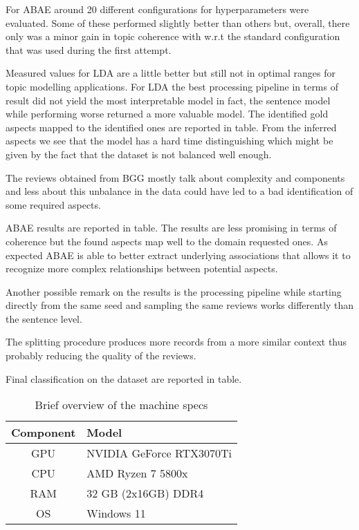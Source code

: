 For ABAE around 20 different configurations for hyperparameters were evaluated.
Some of these performed slightly better than others but, overall, there only was a minor gain in topic coherence with
w.r.t the standard configuration that was used during the first attempt.

Measured values for LDA are a little better but still not in optimal ranges for topic modelling applications.
For LDA the best processing pipeline in terms of result did not yield the most interpretable model in fact,
the sentence model while performing worse returned a more valuable model.
The identified gold aspects mapped to the identified ones are reported in table. %
From the inferred aspects we see that the model has a hard time distinguishing %
which might be given by the fact that the dataset is not balanced well enough.

The reviews obtained from BGG mostly talk about complexity and components and less about %
this unbalance in the data could have led to a bad identification of some required aspects.

ABAE results are reported in table.
The results are less promising in terms of coherence but the found aspects map well to the domain requested
ones.
As expected ABAE is able to better extract underlying associations that allows it to recognize more complex relationships
between potential aspects.

Another possible remark on the results is the processing pipeline while starting directly from the same
seed and sampling the same reviews works differently than the sentence level.

The splitting procedure produces more records from a more similar context thus probably reducing the
quality of the reviews.



Final classification on the dataset are reported in table.
\begin{center}
    \begin{table}
        \begin{tabular}{|c l|}
            \hline
            Component & Model \\ [0.5ex]
            \hline\hline
            GPU       & NVIDIA GeForce RTX3070Ti \\
            \hline
            CPU       & AMD Ryzen 7 5800x        \\
            \hline
            RAM       & 32 GB (2x16GB) DDR4      \\
            \hline
            OS        & Windows 11               \\
            \hline
        \end{tabular}
        \caption{Brief overview of the machine specs}
        \label{specs}

    \end{table}

\end{center}

